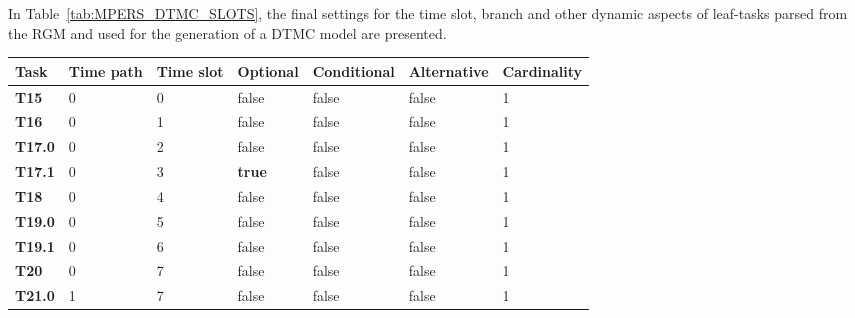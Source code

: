 
In Table~\ref{tab:MPERS_DTMC_SLOTS}, the final settings for the time slot, branch and other dynamic aspects of leaf-tasks parsed from the RGM and used for the generation of a DTMC model are presented.

\begin{table}
{\renewcommand{\arraystretch}{1.5}
\begin{tabularx}{\textwidth}{@{}lllllll@{}}
\toprule
\textbf{Task}  & \textbf{Time path} & \textbf{Time slot} & \textbf{Optional} & \textbf{Conditional} & \textbf{Alternative} & \textbf{Cardinality} \\ \midrule
\textbf{T15}   & 0                  & 0                  & false             & false                & false                & 1           \\
\textbf{T16}   & 0                  & 1                  & false             & false                & false                & 1           \\
\textbf{T17.0} & 0                  & 2                  & false             & false                & false                & 1           \\
\textbf{T17.1} & 0                  & 3                  & \textbf{true}    & false                 & false                & 1           \\
\textbf{T18}   & 0                  & 4                  & false             & false                & false                & 1           \\
\textbf{T19.0} & 0                  & 5                  & false             & false                & false                & 1           \\
\textbf{T19.1} & 0                  & 6                  & false             & false                & false                & 1           \\
\textbf{T20}   & 0                  & 7                  & false             & false                & false                & 1           \\
\textbf{T21.0}   & 1                & 7                  & false             & false                & false                & 1           \\

\end{tabularx}}
\end{table}
